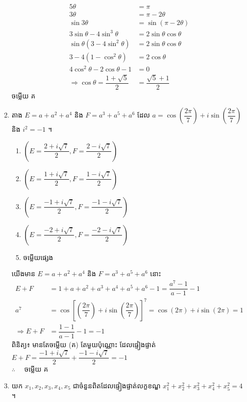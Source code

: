 \documentclass[a4paper,12pt]{article}
\begin{document}
\begin{enumerate}[m]
\begin{center}
		\begin{align*}
			5\theta &= \pi\\
			3\theta &= \pi -2\theta\\
			\sin3\theta &= \sin\left(\pi-2\theta\right)\\
			3\sin\theta-4\sin^3\theta&=2\sin\theta\cos\theta\\
			\sin\theta\left(3-4\sin^2\theta\right)&=2\sin\theta\cos\theta\\
			3-4\left(1-\cos^2\theta\right)&=2\cos\theta\\
			4\cos^2\theta-2\cos\theta-1&=0\\
			\Rightarrow \cos\theta=\dfrac{1+\sqrt{5}}{2}&=\dfrac{\sqrt{5}+1}{2}
		\end{align*}
		\kml ចម្លើយ \kbk គ
	\end{center}
	{\color{blue}\hrulefill}
	\newpage
	\item តាង $E=a+a^2+a^4$ និង $F=a^3+a^5+a^6$ ដែល $a=\cos\left(\dfrac{2\pi}{7}\right)+i\sin\left(\dfrac{2\pi}{7}\right)$ និង $i^2=-1$ ។
	\begin{enumerate}[k,2]
		\item $\left(E=\dfrac{2+i\sqrt{7}}{2},F=\dfrac{2-i\sqrt{7}}{2}\right)$
		\item $\left(E=\dfrac{1+i\sqrt{7}}{2},F=\dfrac{1-i\sqrt{7}}{2}\right)$
		\item $\left(E=\dfrac{-1+i\sqrt{7}}{2},F=\dfrac{-1-i\sqrt{7}}{2}\right)$
		\item $\left(E=\dfrac{-2+i\sqrt{7}}{2},F=\dfrac{-2-i\sqrt{7}}{2}\right)$
		\item ចម្លើយផ្សេង
	\end{enumerate}
	\answer
	\begin{center}
		យើងមាន $E=a+a^2+a^4$ និង $F=a^3+a^5+a^6$ នោះ\\
		\begin{align*}
		E+F&=1+a+a^2+a^3+a^4+a^5+a^6-1=\dfrac{a^7-1}{a-1}-1\\
		a^7&=\cos\left[\left(\dfrac{2\pi}{7}\right)+i\sin\left(\dfrac{2\pi}{7}\right)\right]^7=\cos\left(2\pi\right)+i\sin\left(2\pi\right)=1 \\
		\Rightarrow E+F&=\dfrac{1-1}{a-1}-1=-1
		\end{align*}
		\kml ពិនិត្យ៖ \kb មានតែចម្លើយ (\kml គ) \kb តែមួយប៉ុណ្ណោះ ដែលផ្ទៀងផ្ទាត់ $E+F=\dfrac{-1+i\sqrt{7}}{2}+\dfrac{-1-i\sqrt{7}}{2}=-1$\\
		$\therefore \quad$ \kml ចម្លើយ \kbk គ
	\end{center}
	{\color{blue}\hrulefill}
	\item យក $x_1,x_2,x_3,x_4,x_5$ ជាចំនួនពិតដែលផ្ទៀងផ្ទាត់លក្ខខណ្ឌ $x_1^2+x_2^2+x_3^2+x_4^2+x_5^2=4$ ។\\

\end{enumerate}
\end{document}
